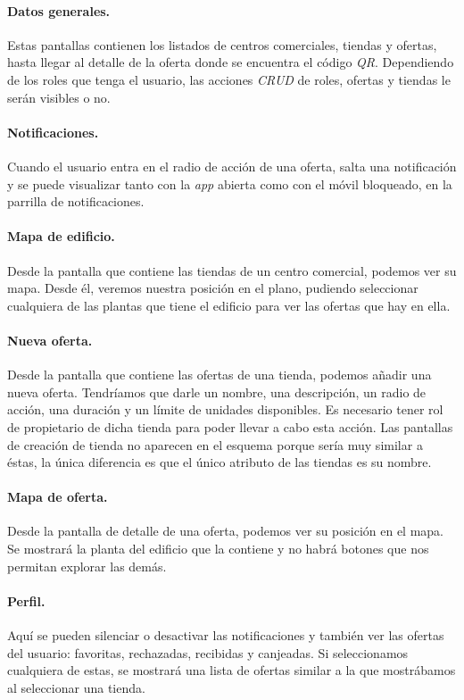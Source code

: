 \paragraph{Datos generales.} Estas pantallas contienen los listados de centros comerciales, tiendas y ofertas, hasta llegar al detalle de la oferta donde se encuentra el código \textit{QR}. Dependiendo de los roles que tenga el usuario, las acciones \textit{CRUD} de roles, ofertas y tiendas le serán visibles o no.

\paragraph{Notificaciones.} Cuando el usuario entra en el radio de acción de una oferta, salta una notificación y se puede visualizar tanto con la \textit{app} abierta como con el móvil bloqueado, en la parrilla de notificaciones.

\paragraph{Mapa de edificio.} Desde la pantalla que contiene las tiendas de un centro comercial, podemos ver su mapa. Desde él, veremos nuestra posición en el plano, pudiendo seleccionar cualquiera de las plantas que tiene el edificio para ver las ofertas que hay en ella.

\paragraph{Nueva oferta.} Desde la pantalla que contiene las ofertas de una tienda, podemos añadir una nueva oferta. Tendríamos que darle un nombre, una descripción, un radio de acción, una duración y un límite de unidades disponibles. Es necesario tener rol de propietario de dicha tienda para poder llevar a cabo esta acción.
Las pantallas de creación de tienda no aparecen en el esquema porque sería muy similar a éstas, la única diferencia es que el único atributo de las tiendas es su nombre.

\paragraph{Mapa de oferta.} Desde la pantalla de detalle de una oferta, podemos ver su posición en el mapa. Se mostrará la planta del edificio que la contiene y no habrá botones que nos permitan explorar las demás.

\paragraph{Perfil.} Aquí se pueden silenciar o desactivar las notificaciones y también ver las ofertas del usuario: favoritas, rechazadas, recibidas y canjeadas. Si seleccionamos cualquiera de estas, se mostrará una lista de ofertas similar a la que mostrábamos al seleccionar una tienda.

